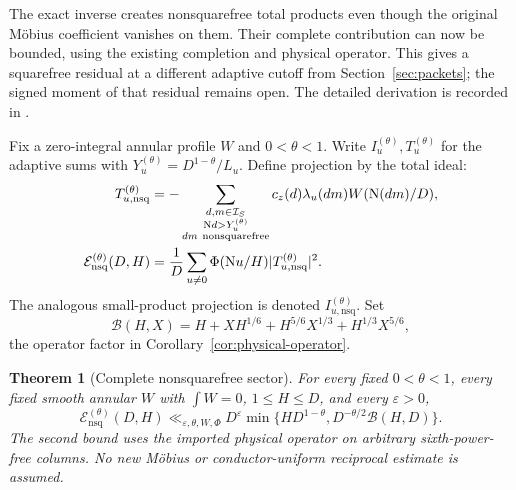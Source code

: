 \documentclass[11pt]{article}
\numberwithin{equation}{section}
\newtheorem{theorem}{Theorem}[section]
\theoremstyle{definition}
\theoremstyle{remark}
\newcommand{\N}{\mathrm N}
\newcommand{\eps}{\varepsilon}
\newcommand{\good}{\mathcal I_S}
\begin{document}
The exact inverse creates nonsquarefree total products even though the
original M\"obius coefficient vanishes on them. Their complete contribution
can now be bounded, using the existing completion and physical operator.
This gives a squarefree residual at a different adaptive cutoff from
Section~\ref{sec:packets}; the signed moment of that residual remains open.
The detailed derivation is recorded in \cite{N17}.

Fix a zero-integral annular profile \(W\) and \(0<\theta<1\).
Write \(I_u^{(\theta)},T_u^{(\theta)}\) for the adaptive sums with
\(Y_u^{(\theta)}=D^{1-\theta}/L_u\). Define projection by the total ideal:
\begin{align}
 T_{u,\mathrm{nsq}}^{(\theta)}
 &=-\sum_{\substack{d,m\in\good\\
             \N d>Y_u^{(\theta)}\\dm\ \mathrm{nonsquarefree}}}
       c_z(d)\lambda_u(dm)W(\N(dm)/D),\notag\\
 \mathcal E_{\mathrm{nsq}}^{(\theta)}(D,H)
 &=\frac1D\sum_{u\ne0}\Phi(\N u/H)
       |T_{u,\mathrm{nsq}}^{(\theta)}|^2.\label{eq:nsq-projection}
\end{align}
The analogous small-product projection is denoted
\(I_{u,\mathrm{nsq}}^{(\theta)}\). Set
\[
 \mathcal B(H,X)=H+XH^{1/6}
                   +H^{5/6}X^{1/3}+H^{1/3}X^{5/6},
\]
the operator factor in Corollary~\ref{cor:physical-operator}.

\begin{theorem}[Complete nonsquarefree sector]\label{thm:nsq-tail}
For every fixed \(0<\theta<1\), every fixed smooth annular \(W\) with
\(\int W=0\), \(1\le H\le D\), and every \(\eps>0\),
\begin{equation}\label{eq:nsq-tail-bound}
 \mathcal E_{\mathrm{nsq}}^{(\theta)}(D,H)
 \ll_{\eps,\theta,W,\Phi}
 D^\eps\min\{HD^{1-\theta},
                    D^{-\theta/2}\mathcal B(H,D)\}.
\end{equation}
The second bound uses the imported physical operator on arbitrary
sixth-power-free columns. No new M\"obius or conductor-uniform
reciprocal estimate is assumed.
\end{theorem}
\end{document}

